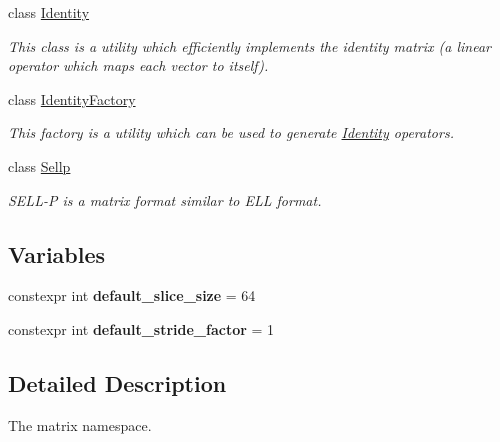 \begin{DoxyCompactItemize}
class \hyperlink{classgko_1_1matrix_1_1Identity}{Identity}
\begin{DoxyCompactList}\small\item\em This class is a utility which efficiently implements the identity matrix (a linear operator which maps each vector to itself). \end{DoxyCompactList}\item 
class \hyperlink{classgko_1_1matrix_1_1IdentityFactory}{Identity\+Factory}
\begin{DoxyCompactList}\small\item\em This factory is a utility which can be used to generate \hyperlink{classgko_1_1matrix_1_1Identity}{Identity} operators. \end{DoxyCompactList}\item 
class \hyperlink{classgko_1_1matrix_1_1Sellp}{Sellp}
\begin{DoxyCompactList}\small\item\em S\+E\+L\+L-\/P is a matrix format similar to E\+LL format. \end{DoxyCompactList}\end{DoxyCompactItemize}
\subsection*{Variables}
\begin{DoxyCompactItemize}
\item 
\mbox{\label{namespacegko_1_1matrix_a80dd7829c1ed8b1bed2e182f4a9c5634}} 
constexpr int {\bfseries default\+\_\+slice\+\_\+size} = 64
\item 
\mbox{\label{namespacegko_1_1matrix_a26ccb7bd77d0d18162e18a76d0277a80}} 
constexpr int {\bfseries default\+\_\+stride\+\_\+factor} = 1
\end{DoxyCompactItemize}


\subsection{Detailed Description}
The matrix namespace. 